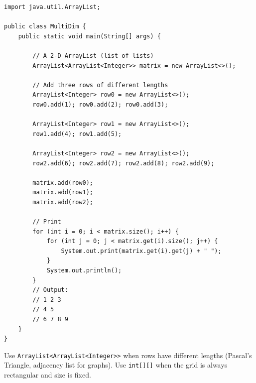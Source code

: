 \documentclass[12pt,a4paper,oneside]{book}
\begin{document}
\begin{lstlisting}[caption={2-D ArrayList --- Declare, Fill, and Print}]
import java.util.ArrayList;

public class MultiDim {
    public static void main(String[] args) {

        // A 2-D ArrayList (list of lists)
        ArrayList<ArrayList<Integer>> matrix = new ArrayList<>();

        // Add three rows of different lengths
        ArrayList<Integer> row0 = new ArrayList<>();
        row0.add(1); row0.add(2); row0.add(3);

        ArrayList<Integer> row1 = new ArrayList<>();
        row1.add(4); row1.add(5);

        ArrayList<Integer> row2 = new ArrayList<>();
        row2.add(6); row2.add(7); row2.add(8); row2.add(9);

        matrix.add(row0);
        matrix.add(row1);
        matrix.add(row2);

        // Print
        for (int i = 0; i < matrix.size(); i++) {
            for (int j = 0; j < matrix.get(i).size(); j++) {
                System.out.print(matrix.get(i).get(j) + " ");
            }
            System.out.println();
        }
        // Output:
        // 1 2 3
        // 4 5
        // 6 7 8 9
    }
}
\end{lstlisting}

\begin{center}
\end{center}

\begin{tipbox}
Use \texttt{ArrayList<ArrayList<Integer>>} when rows have different lengths (Pascal's Triangle, adjacency list for graphs). Use \texttt{int[][]} when the grid is always rectangular and size is fixed.
\end{tipbox}
\end{document}
